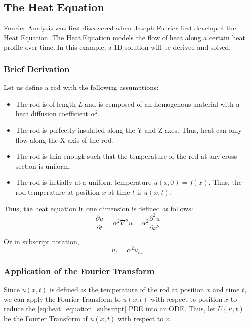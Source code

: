 \subsection{The Heat Equation}
Fourier Analysis was first discovered when Joseph Fourier first developed the Heat Equation. The Heat Equation models the flow of heat along a certain heat profile over time. In this example, a 1D solution will be derived and solved.

\subsubsection{Brief Derivation}
\noindent
Let us define a rod with the following assumptions:
\begin{itemize}
    \item The rod is of length \(L\) and is composed of an homogenous material with a heat diffusion coefficient \( \alpha^2 \).
    \item The rod is perfectly insulated along the Y and Z axes. Thus, heat can only flow along the X axis of the rod.
    \item The rod is thin enough such that the temperature of the rod at any cross-section is uniform.
    \item The rod is initially at a uniform temperature \(u(x,0) = f(x)\). Thus, the rod temperature at position \(x\) at time \(t\) is \(u(x,t)\).
\end{itemize}


\noindent
Thus, the heat equation in one dimension is defined as follows:
\begin{equation} \label{eq:heat_equation}
    \frac{\partial u}{\partial t} = \alpha^2 \nabla^2 u = \alpha^2 \frac{\partial^2 u}{\partial x^2}
\end{equation}

\noindent
Or in subscript notation,
\begin{equation} \label{eq:heat_equation_subscript}
    u_t = \alpha^2 u_{xx}
\end{equation}

\subsubsection{Application of the Fourier Transform}
Since \(u(x,t)\) is defined as the temperature of the rod at position \(x\) and time \(t\), we can apply the Fourier Transform to \(u(x,t)\) with respect to position \(x\) to reduce the \cref{eq:heat_equation_subscript} PDE into an ODE. Thus, let \(U(\kappa,t)\) be the Fourier Transform of \(u(x,t)\) with respect to \(x\).

